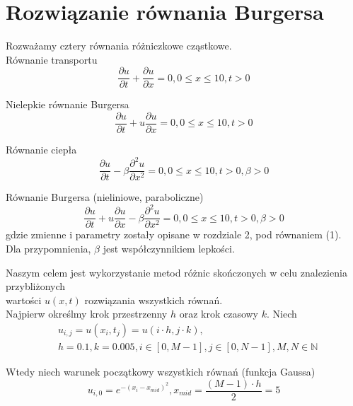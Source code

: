 \documentclass[12pt, a4paper]{article}
\begin{document}
\section{Rozwiązanie równania Burgersa}
Rozważamy cztery równania różniczkowe cząstkowe.\\

Równanie transportu
\begin{equation}
\frac{\partial u}{\partial t}+\frac{\partial u}{\partial x}=0, 0\leqslant x\leqslant10, t>0
\end{equation}
\vspace{0.5cm}

Nielepkie równanie Burgersa
\begin{equation}
\frac{\partial u}{\partial t}+u\frac{\partial u}{\partial x}=0, 0\leqslant x\leqslant10, t>0
\end{equation}
\vspace{0.5cm}

Równanie ciepła
\begin{equation}
\frac{\partial u}{\partial t}-\beta\frac{\partial^{2} u}{\partial x^{2}}=0, 0\leqslant x\leqslant10, t>0, \beta>0
\end{equation}
\vspace{0.5cm}

Równanie Burgersa (nieliniowe, paraboliczne)
\begin{equation}
\frac{\partial u}{\partial t}+u\frac{\partial u}{\partial x}-\beta\frac{\partial^{2} u}{\partial x^{2}}=0, 0\leqslant x\leqslant10, t>0, \beta>0
\end{equation}
gdzie zmienne i parametry zostały opisane w rozdziale 2, pod równaniem (1).\\
Dla przypomnienia, $\beta$ jest współczynnikiem lepkości.
\vspace{0.5cm}

Naszym celem jest wykorzystanie metod różnic skończonych w celu znalezienia przybliżonych\\
wartości $u(x,t)$ rozwiązania wszystkich równań.\\
Najpierw określmy krok przestrzenny $h$ oraz krok czasowy $k$. Niech
\begin{equation}
\begin{split}
& u_{i,j}=u(x_{i},t_{j})=u(i\cdot h,j\cdot k),\\
& h=0.1, k=0.005, i\in[0,M-1], j\in[0,N-1], M,N\in\mathbb{N}
\end{split}
\end{equation}

Wtedy niech warunek początkowy wszystkich równań (funkcja Gaussa)
\begin{equation}
u_{i,0}=e^{-(x_{i}-x_{mid})^{2}}, x_{mid}=\frac{(M - 1) \cdot h}{2}=5
\end{equation}
\end{document}
